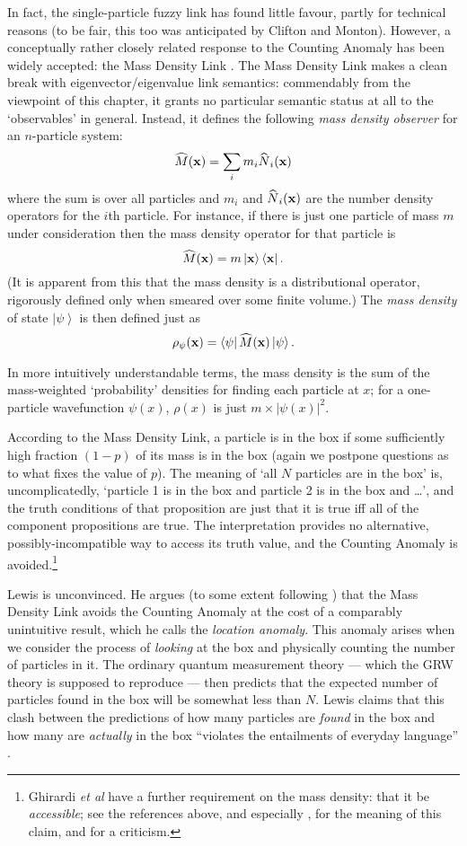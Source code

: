 \documentclass[12pt]{article}
\newcommand{\be}{\begin{equation}}
\newcommand{\ee}{\end{equation}}
\newcommand{\vctr}[1]{\ensuremath{\mathbf{ #1 }}}
\newcommand{\ket}[1]{\ensuremath{\left|  #1 \right\rangle}}
\newcommand{\bra}[1]{\ensuremath{\left\langle #1 \right|}}
\newcommand{\proj}[2]{\ensuremath{\ket{#1} \bra{#2}}}
\newcommand{\matel}[3]{\ensuremath{\bra{#1} #2 \ket{#3}}}
\newcommand{\op}[1]{\ensuremath{\widehat{\textsf{\ensuremath{#1}}}}}
\begin{document}
In fact, the single-particle fuzzy link has found little favour, partly for technical reasons (to be fair, this too was anticipated by Clifton and Monton). However, a conceptually rather closely related  response to the Counting Anomaly has been widely accepted: the Mass Density Link \cite{ghirardigrassibenati}. The Mass Density Link makes a clean break with eigenvector/eigenvalue link semantics: commendably from the viewpoint of this chapter, it grants no particular semantic status at all to the `observables' in general. Instead, it defines the following \emph{mass density observer} for an $n$-particle system:
\be
\op{M}(\vctr{x})=\sum_i m_i \op{N}_i(\vctr{x})
\ee
where the sum is over all particles and $m_i$ and $\op{N}_i(\vctr{x})$ are the number density operators for the $i$th particle. For instance, if there is just one particle of mass $m$ under consideration then the mass density operator for that particle is
\be
\op{M}(\vctr{x})=m \proj{\vctr{x}}{\vctr{x}}.
\ee
(It is apparent from this that the mass density is a distributional operator, rigorously defined only when smeared over some finite volume.) The \emph{mass density} of state \ket{\psi}  is then defined just as
\be
\rho_\psi(\vctr{x})=\matel{\psi}{\op{M}(\vctr{x})}{\psi}.
\ee

In more intuitively understandable terms, the mass density is the sum of the mass-weighted `probability' densities for finding each particle at $x$; for a one-particle wavefunction $\psi(x)$, $\rho(x)$ is just $m \times |\psi(x)|^2$.

According to the Mass Density Link, a particle is in the box if some sufficiently high fraction $(1-p)$ of its mass is in the box (again we postpone questions as to what fixes the value of $p$). The meaning of `all $N$ particles are in the box' is, uncomplicatedly, `particle 1 is in the box and particle 2 is in the box and \ldots', and the truth conditions of that proposition are just that it is true iff all of the component propositions are true. The interpretation provides no alternative, possibly-incompatible way to access its truth value, and the Counting Anomaly is avoided.\footnote{Ghirardi \emph{et al} have a further requirement on the mass density: that it be \emph{accessible}; see the references above, and especially , for the meaning of this claim, and  for a criticism.}

Lewis \citeyear{lewis2003,lewisfuzzy,lewis2005} is unconvinced. He argues (to some extent following ) that the Mass Density Link avoids the Counting Anomaly at the cost of a comparably unintuitive result, which he calls the \emph{location anomaly}. This anomaly arises when we consider the process of \emph{looking} at the box and physically counting the number of particles in it. The ordinary quantum measurement theory --- which the GRW theory is supposed to reproduce --- then predicts that the expected number of particles found in the box will be somewhat less than $N$. Lewis claims that this clash between the predictions of how many particles are \emph{found} in the box and how many are \emph{actually} in the box ``violates the entailments of everyday language'' \cite[p.\,174]{lewis2005}.
\end{document}
